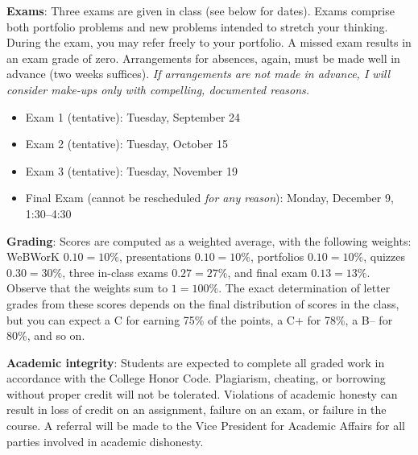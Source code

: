 \documentclass[12pt,twoside]{amsart}
\begin{document}
\textbf{Exams}: Three exams are given in class (see below for dates). Exams comprise both portfolio problems and new problems intended to stretch your thinking. During the exam, you may refer freely to your portfolio. A missed exam results in an exam grade of zero. Arrangements for absences, again, must be made well in advance (two weeks suffices). \emph{If arrangements are not made in advance, I will consider make-ups only with compelling, documented reasons.} 
\begin{itemize}
	\item Exam 1 (tentative): Tuesday, September 24
	\item Exam 2 (tentative): Tuesday, October 15
    \item Exam 3 (tentative): Tuesday, November 19
	\item Final Exam (cannot be rescheduled \emph{for any reason}): Monday, December 9, 1:30--4:30
\end{itemize}

\textbf{Grading}: Scores are computed as a weighted average, with the following weights: WeBWorK $0.10 = 10\%$, presentations $0.10 = 10\%$, portfolios $0.10 = 10\%$, quizzes $0.30 = 30\%$, three in-class exams $0.27 = 27\%$, and final exam $0.13 = 13\%$. Observe that the weights sum to $1 = 100\%$. The exact determination of letter grades from these scores depends on the final distribution of scores in the class, but you can expect a C for earning 75\% of the points, a C+ for 78\%, a B-- for 80\%, and so on.

\textbf{Academic integrity}: Students are expected to complete all graded work in accordance with the College Honor Code. Plagiarism, cheating, or borrowing without proper credit will not be tolerated.  Violations of academic honesty can result in loss of credit on an assignment, failure on an exam, or failure in the course. A referral will be made to the Vice President for Academic Affairs for all parties involved in academic dishonesty.

\end{document}
